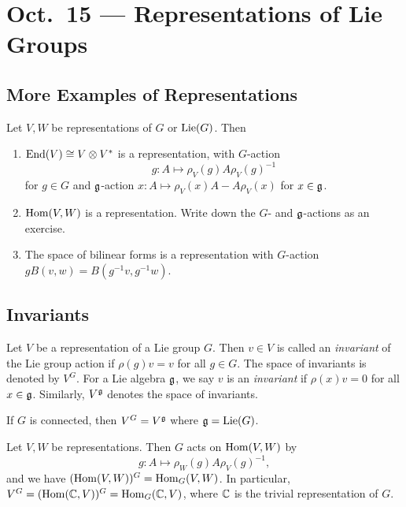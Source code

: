\chapter{Oct.~15 --- Representations of Lie Groups}

\section{More Examples of Representations}

\begin{example}
  Let $V, W$ be representations of
  $G$ or $\operatorname{Lie}(G)$. Then
  \begin{enumerate}
    \item $\operatorname{End}(V) \cong V \otimes V^*$
      is a representation, with
      $G$-action
      \[
        g : A \mapsto
        \rho_V(g) A \rho_V(g)^{-1}
      \]
      for $g \in G$ and $\mathfrak{g}$-action
      $x : A \mapsto \rho_V(x) A - A \rho_V(x)$
      for $x \in \mathfrak{g}$.
    \item $\operatorname{Hom}(V, W)$ is a representation.
      Write down the $G$- and $\mathfrak{g}$-actions
      as an exercise.
    \item The space of bilinear forms
      is a representation with
      $G$-action $g B(v, w) = B(g^{-1} v, g^{-1} w)$.
  \end{enumerate}
\end{example}

\section{Invariants}

\begin{definition}
  Let $V$ be a representation of a Lie
  group $G$. Then $v \in V$ is called an
  \emph{invariant} of the Lie group action
  if $\rho(g) v = v$ for all $g \in G$.
  The space of invariants is denoted by $V^G$.
  For a Lie algebra $\mathfrak{g}$, we say
  $v$ is an \emph{invariant} if
  $\rho(x) v = 0$ for all $x \in \mathfrak{g}$.
  Similarly, $V^{\mathfrak{g}}$ denotes the
  space of invariants.
\end{definition}

\begin{prop}
  If $G$ is connected, then
  $V^G = V^{\mathfrak{g}}$ where
  $\mathfrak{g} = \operatorname{Lie}(G)$.
\end{prop}

\begin{example}
  Let $V, W$ be representations. Then
  $G$ acts on
  $\operatorname{Hom}(V, W)$ by
  \[
    g : A \mapsto \rho_W(g) A \rho_V(g)^{-1},
  \]
  and we have $(\operatorname{Hom}(V, W))^G = \operatorname{Hom}_G(V, W)$.
  In particular, $V^G = (\operatorname{Hom}(\mathbb{C}, V))^G = \operatorname{Hom}_G(\mathbb{C}, V)$,
  where $\mathbb{C}$ is the trivial representation
  of $G$.
\end{example}

